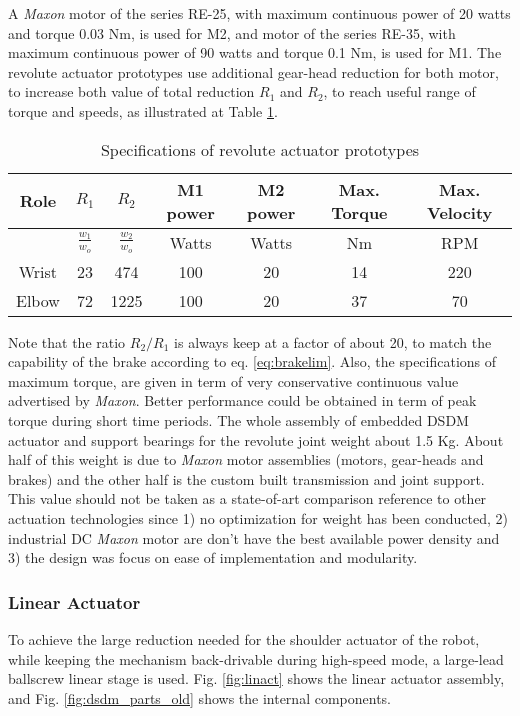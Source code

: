 A \textit{Maxon} motor of the series RE-25, with maximum continuous power of 20 watts and torque 0.03 Nm, is used for M2, and motor of the series RE-35, with maximum continuous power of 90 watts and torque 0.1 Nm, is used for M1. The revolute actuator prototypes use additional gear-head reduction for both motor, to increase both value of total reduction $R_1$ and $R_2$, to reach useful range of torque and speeds, as illustrated at Table \ref{tab:specrev}. 
%
\begin{table}[htbp]
	\centering
	\caption{Specifications of revolute actuator prototypes}
		\begin{tabular}{ c c c c c c c}
			\hline
			Role & $R_1$ & $R_2$ & M1 power & M2 power & Max. Torque & Max. Velocity \\
			\hline
			       & $\frac{w_1}{w_o}$ & $\frac{w_2}{w_o}$ & Watts & Watts & Nm & RPM \\
			\hline \hline
			Wrist & 23 & 474  & 100 & 20 & 14 & 220 \\
			Elbow & 72 & 1225 & 100 & 20 & 37 & 70 \\
			\hline
		\end{tabular}
	\label{tab:specrev}
\end{table}
 
Note that the ratio $R_2/R_1$ is always keep at a factor of about 20, to match the capability of the brake according to eq. \eqref{eq:brakelim}. Also, the specifications of maximum torque, are given in term of very conservative continuous value advertised by \textit{Maxon}. Better performance could be obtained in term of peak torque during short time periods. The whole assembly of embedded DSDM actuator and support bearings for the revolute joint weight about 1.5 Kg. About half of this weight is due to \textit{Maxon} motor assemblies (motors, gear-heads and brakes) and the other half is the custom built transmission and joint support. This value should not be taken as a state-of-art comparison reference to other actuation technologies since 1) no optimization for weight has been conducted, 2) industrial DC \textit{Maxon} motor are don't have the best available power density and 3) the design was focus on ease of implementation and modularity. 


\subsubsection{Linear Actuator}

To achieve the large reduction needed for the shoulder actuator of the robot, while keeping the mechanism back-drivable during high-speed mode, a large-lead ballscrew linear stage is used. Fig. \ref{fig:linact} shows the linear actuator assembly, and Fig. \ref{fig:dsdm_parts_old} shows the internal components. 

